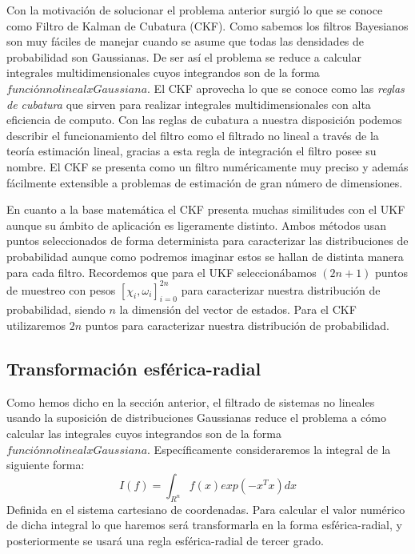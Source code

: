 Con la motivación de solucionar el problema anterior surgió lo que se conoce como Filtro de Kalman de Cubatura (CKF).
Como sabemos los filtros Bayesianos son muy fáciles de manejar cuando se asume que todas las densidades de probabilidad son Gaussianas.
De ser así el problema se reduce a calcular integrales multidimensionales cuyos integrandos son de la forma $función no lineal x Gaussiana$.
El \ac{CKF} aprovecha lo que se conoce como las \textit{reglas de cubatura} que sirven para realizar integrales multidimensionales con alta eficiencia de computo.
Con las reglas de cubatura a nuestra disposición podemos describir el funcionamiento del filtro como el filtrado no lineal a través de la teoría estimación lineal, gracias a esta regla de integración el filtro posee su nombre.
El \ac{CKF} se presenta como un filtro numéricamente muy preciso y además fácilmente extensible a problemas de estimación de gran número de dimensiones.

En cuanto a la base matemática el \ac{CKF} presenta muchas similitudes con el \ac{UKF} aunque su ámbito de aplicación es ligeramente distinto.
Ambos métodos usan puntos seleccionados de forma determinista para caracterizar las distribuciones de probabilidad aunque como podremos imaginar estos se hallan de distinta manera para cada filtro.
Recordemos que para el \ac{UKF} seleccionábamos $(2n+1)$ puntos de muestreo con pesos $[\chi_{i},\omega_{i}]_{i=0}^{2n}$ para caracterizar nuestra distribución de probabilidad, siendo $n$ la dimensión del vector de estados.
Para el \ac{CKF} utilizaremos $2n$ puntos para caracterizar nuestra distribución de probabilidad.


\subsection{Transformación esférica-radial}
Como hemos dicho en la sección anterior, el filtrado de sistemas no lineales usando la suposición de distribuciones Gaussianas reduce el problema a cómo calcular las integrales cuyos integrandos son de la forma $función no lineal x Gaussiana$.
Específicamente consideraremos la integral de la siguiente forma:
\begin{equation}\label{Ec:CKF_1}
I(f)=\int_{R^{n}}f(x)exp(-x^{T}x)dx 
\end{equation}
Definida en el sistema cartesiano de coordenadas.
Para calcular el valor numérico de dicha integral lo que haremos será transformarla en la forma esférica-radial, y posteriormente se usará una regla esférica-radial de tercer grado.

